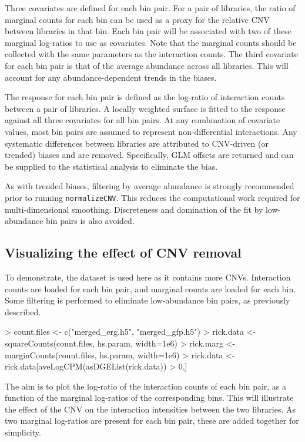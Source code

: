 \documentclass[12pt]{report}
\renewenvironment{Schunk}{\vspace{0pt}}{\vspace{0pt}}
\newcommand{\code}[1]{{\small\texttt{#1}}}
\begin{document}
Three covariates are defined for each bin pair.
For a pair of libraries, the ratio of marginal counts for each bin can be used as a proxy for the relative CNV between libraries in that bin.
Each bin pair will be associated with two of these marginal log-ratios to use as covariates.
Note that the marginal counts should be collected with the same parameters as the interaction counts.
The third covariate for each bin pair is that of the average abundance across all libraries.
This will account for any abundance-dependent trends in the biases.

The response for each bin pair is defined as the log-ratio of interaction counts between a pair of  libraries.
A locally weighted surface is fitted to the response against all three covariates for all bin pairs.
At any combination of covariate values, most bin pairs are assumed to represent non-differential interactions.
Any systematic differences between libraries are attributed to CNV-driven (or trended) biases and are removed.
Specifically, GLM offsets are returned and can be supplied to the statistical analysis to eliminate the bias.

As with trended biases, filtering by average abundance is strongly recommended prior to running \code{normalizeCNV}.
This reduces the computational work required for multi-dimensional smoothing.
Discreteness and domination of the fit by low-abundance bin pairs is also avoided.

\subsection{Visualizing the effect of CNV removal}
To demonstrate, the \citeauthor{rickman2012oncogene} dataset is used here as it contains more CNVs.
Interaction counts are loaded for each bin pair, and marginal counts are loaded for each bin.
Some filtering is performed to eliminate low-abundance bin pairs, as previously described.

\begin{Schunk}
\begin{Sinput}
> count.files <- c("merged_erg.h5", "merged_gfp.h5")
> rick.data <- squareCounts(count.files, hs.param, width=1e6)
> rick.marg <- marginCounts(count.files, hs.param, width=1e6)
> rick.data <- rick.data[aveLogCPM(asDGEList(rick.data)) > 0,]
\end{Sinput}
\end{Schunk}

The aim is to plot the log-ratio of the interaction counts of each bin pair, as a function of the marginal log-ratios of the corresponding bins.
This will illustrate the effect of the CNV on the interaction intensities between the two libraries.
As two marginal log-ratios are present for each bin pair, these are added together for simplicity.
\end{document}
